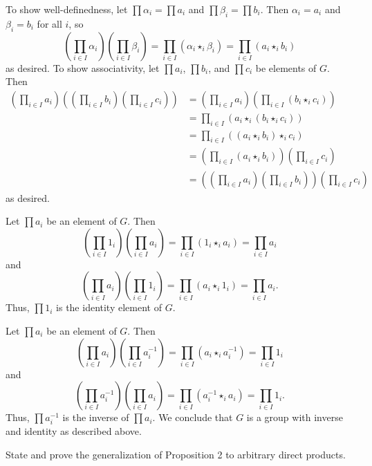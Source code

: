 \begin{solalph}
    \item To show well-definedness, let $\prod \alpha_i = \prod a_i$ and $\prod \beta_i = \prod b_i$. Then $\alpha_i = a_i$ and $\beta_i = b_i$ for all $i$, so
    \[\left(\prod_{i \in I} \alpha_i\right)\left(\prod_{i \in I} \beta_i\right) = \prod_{i \in I} (\alpha_i \star_i \beta_i) = \prod_{i \in I} (a_i \star_i b_i)\]
    as desired. To show associativity, let $\prod a_i$, $\prod b_i$, and $\prod c_i$ be elements of $G$. Then
    \begin{align*}
        \left(\prod_{i \in I} a_i\right)\left(\left(\prod_{i \in I} b_i\right)\left(\prod_{i \in I} c_i\right)\right) & = \left(\prod_{i \in I} a_i\right)\left(\prod_{i \in I} (b_i \star_i c_i)\right) \\
        & = \prod_{i \in I} (a_i \star_i (b_i \star_i c_i)) \\
        & = \prod_{i \in I} ((a_i \star_i b_i) \star_i c_i) \\
        & = \left(\prod_{i \in I} (a_i \star_i b_i)\right)\left(\prod_{i \in I} c_i\right) \\
        & = \left(\left(\prod_{i \in I} a_i\right)\left(\prod_{i \in I} b_i\right)\right)\left(\prod_{i \in I} c_i\right)
    \end{align*}
    as desired.
    \item Let $\prod a_i$ be an element of $G$. Then
    \[\left(\prod_{i \in I} 1_i\right)\left(\prod_{i \in I} a_i\right) = \prod_{i \in I} (1_i \star_i a_i) = \prod_{i \in I} a_i\]
    and
    \[\left(\prod_{i \in I} a_i\right)\left(\prod_{i \in I} 1_i\right) = \prod_{i \in I} (a_i \star_i 1_i) = \prod_{i \in I} a_i.\]
    Thus, $\prod 1_i$ is the identity element of $G$.
    \item Let $\prod a_i$ be an element of $G$. Then
    \[\left(\prod_{i \in I} a_i\right)\left(\prod_{i \in I} a_i^{-1}\right) = \prod_{i \in I} (a_i \star_i a_i^{-1}) = \prod_{i \in I} 1_i\]
    and
    \[\left(\prod_{i \in I} a_i^{-1}\right)\left(\prod_{i \in I} a_i\right) = \prod_{i \in I} (a_i^{-1} \star_i a_i) = \prod_{i \in I} 1_i.\]
    Thus, $\prod a_i^{-1}$ is the inverse of $\prod a_i$. We conclude that $G$ is a group with inverse and identity as described above.
\end{solalph}

\begin{exercise}\label{ex5.1.16}
    State and prove the generalization of Proposition 2 to arbitrary direct products.
\end{exercise}

